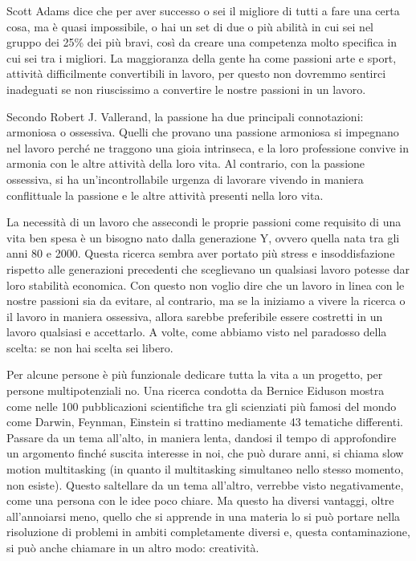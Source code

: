 \documentclass[12pt]{book} %
\begin{document}
\begin{mdframed}[linewidth=1pt]
Scott Adams dice che per aver successo o sei il migliore di tutti a fare una certa cosa, ma è quasi impossibile, o hai
un set di due o più abilità in cui sei nel gruppo dei 25\% dei più bravi, così da creare una competenza molto specifica
in cui sei tra i migliori. La maggioranza della gente ha come passioni arte e sport, attività difficilmente
convertibili in lavoro, per questo non dovremmo sentirci inadeguati se non riuscissimo a convertire le nostre passioni
in un lavoro.

Secondo Robert J. Vallerand, la passione ha due principali connotazioni: armoniosa o ossessiva. Quelli che provano una
passione armoniosa si impegnano nel lavoro perché ne traggono una gioia intrinseca, e la loro professione convive in
armonia con le altre attività della loro vita. Al contrario, con la passione ossessiva, si ha
un'incontrollabile urgenza di lavorare vivendo in maniera conflittuale la passione e le altre
attività presenti nella loro vita.

La necessità di un lavoro che assecondi le proprie passioni come requisito di una vita ben spesa è un bisogno nato dalla
generazione Y, ovvero quella nata tra gli anni 80 e 2000. Questa ricerca sembra aver portato più stress e
insoddisfazione rispetto alle generazioni precedenti che sceglievano un qualsiasi lavoro potesse dar loro stabilità
economica. Con questo non voglio dire che un lavoro in linea con le nostre passioni sia da evitare, al contrario, ma se
la iniziamo a vivere la ricerca o il lavoro in maniera ossessiva, allora sarebbe preferibile essere costretti in un
lavoro qualsiasi e accettarlo. A volte, come abbiamo visto nel paradosso della scelta: se non hai scelta sei libero.

Per alcune persone è più funzionale dedicare tutta la vita a un progetto, per persone multipotenziali no. Una ricerca
condotta da Bernice Eiduson mostra come nelle 100 pubblicazioni scientifiche tra gli scienziati più famosi del mondo
come Darwin, Feynman, Einstein si trattino mediamente 43 tematiche differenti. Passare da un tema
all'alto, in maniera lenta, dandosi il tempo di approfondire un argomento finché suscita interesse
in noi, che può durare anni, si chiama slow motion multitasking (in quanto il multitasking simultaneo nello stesso
momento, non esiste). Questo saltellare da un tema all'altro, verrebbe visto negativamente, come
una persona con le idee poco chiare. Ma questo ha diversi vantaggi, oltre all'annoiarsi meno,
quello che si apprende in una materia lo si può portare nella risoluzione di problemi in ambiti completamente diversi
e, questa contaminazione, si può anche chiamare in un altro modo:
creatività.


\end{mdframed}
\end{document}
